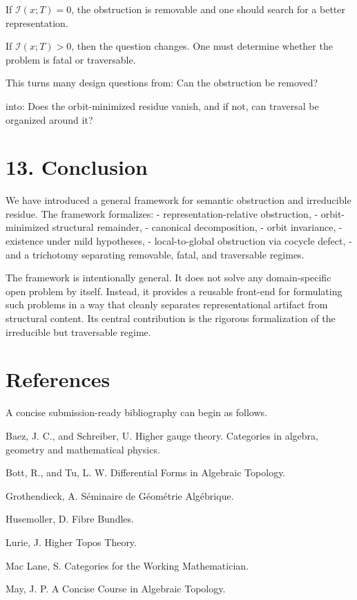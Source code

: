 \documentclass[
]{article}
\begin{document}
If \(\mathcal{I}(x;T)=0\), the obstruction is removable and one should
search for a better representation.

If \(\mathcal{I}(x;T)>0\), then the question changes. One must determine
whether the problem is fatal or traversable.

This turns many design questions from: Can the obstruction be removed?

into: Does the orbit-minimized residue vanish, and if not, can traversal
be organized around it?

\section{13. Conclusion}\label{conclusion}

We have introduced a general framework for semantic obstruction and
irreducible residue. The framework formalizes: - representation-relative
obstruction, - orbit-minimized structural remainder, - canonical
decomposition, - orbit invariance, - existence under mild hypotheses, -
local-to-global obstruction via cocycle defect, - and a trichotomy
separating removable, fatal, and traversable regimes.

The framework is intentionally general. It does not solve any
domain-specific open problem by itself. Instead, it provides a reusable
front-end for formulating such problems in a way that cleanly separates
representational artifact from structural content. Its central
contribution is the rigorous formalization of the irreducible but
traversable regime.

\section{References}\label{references}

A concise submission-ready bibliography can begin as follows.

Baez, J. C., and Schreiber, U. Higher gauge theory. Categories in
algebra, geometry and mathematical physics.

Bott, R., and Tu, L. W. Differential Forms in Algebraic Topology.

Grothendieck, A. Séminaire de Géométrie Algébrique.

Husemoller, D. Fibre Bundles.

Lurie, J. Higher Topos Theory.

Mac Lane, S. Categories for the Working Mathematician.

May, J. P. A Concise Course in Algebraic Topology.
\end{document}
